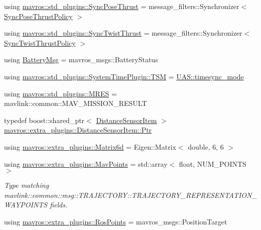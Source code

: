 \begin{DoxyCompactItemize}
\item 
using \mbox{\hyperlink{group__plugin_gab78f646d4cfccf2c656a3aeb2605cad1}{mavros\+::std\+\_\+plugins\+::\+Sync\+Pose\+Thrust}} = message\+\_\+filters\+::\+Synchronizer$<$ \mbox{\hyperlink{group__plugin_ga48ed4062810bb42590cbed0b4e0dc237}{Sync\+Pose\+Thrust\+Policy}} $>$
\item 
using \mbox{\hyperlink{group__plugin_ga4a8954a9b71d632e038309fa85fe5bb2}{mavros\+::std\+\_\+plugins\+::\+Sync\+Twist\+Thrust}} = message\+\_\+filters\+::\+Synchronizer$<$ \mbox{\hyperlink{group__plugin_gacfaec844da30bf9462d4583c55fa64e1}{Sync\+Twist\+Thrust\+Policy}} $>$
\item 
using \mbox{\hyperlink{group__plugin_gaa1fcc4bfa5eda09f217448b6d2d373fa}{Battery\+Msg}} = mavros\+\_\+msgs\+::\+Battery\+Status
\item 
using \mbox{\hyperlink{group__plugin_ga57fc98429d89947298f623d8fbb37364}{mavros\+::std\+\_\+plugins\+::\+System\+Time\+Plugin\+::\+T\+SM}} = \mbox{\hyperlink{group__mavutils_gac7f53712a7627f397d0eb145c2a16cf7}{U\+A\+S\+::timesync\+\_\+mode}}
\item 
using \mbox{\hyperlink{group__plugin_ga70798af9f8bc5db9dd75d667d4488ae6}{mavros\+::std\+\_\+plugins\+::\+M\+R\+ES}} = mavlink\+::common\+::\+M\+A\+V\+\_\+\+M\+I\+S\+S\+I\+O\+N\+\_\+\+R\+E\+S\+U\+LT
\item 
typedef boost\+::shared\+\_\+ptr$<$ \mbox{\hyperlink{classmavros_1_1extra__plugins_1_1DistanceSensorItem}{Distance\+Sensor\+Item}} $>$ \mbox{\hyperlink{group__plugin_ga0156f4cebc73c6f4b88d5a4053e98c2b}{mavros\+::extra\+\_\+plugins\+::\+Distance\+Sensor\+Item\+::\+Ptr}}
\item 
using \mbox{\hyperlink{group__plugin_gaf27101661ecc1fbce6f79a56a3982327}{mavros\+::extra\+\_\+plugins\+::\+Matrix6d}} = Eigen\+::\+Matrix$<$ double, 6, 6 $>$
\item 
using \mbox{\hyperlink{group__plugin_gafae91f0662f199848c074fd4d2edd106}{mavros\+::extra\+\_\+plugins\+::\+Mav\+Points}} = std\+::array$<$ float, N\+U\+M\+\_\+\+P\+O\+I\+N\+TS $>$
\begin{DoxyCompactList}\small\item\em Type matching mavlink\+::common\+::msg\+::\+T\+R\+A\+J\+E\+C\+T\+O\+R\+Y\+::\+T\+R\+A\+J\+E\+C\+T\+O\+R\+Y\+\_\+\+R\+E\+P\+R\+E\+S\+E\+N\+T\+A\+T\+I\+O\+N\+\_\+\+W\+A\+Y\+P\+O\+I\+N\+TS fields. \end{DoxyCompactList}\item 
using \mbox{\hyperlink{group__plugin_ga93699d5632be3dfe1bb548ed5a0b4171}{mavros\+::extra\+\_\+plugins\+::\+Ros\+Points}} = mavros\+\_\+msgs\+::\+Position\+Target
\end{DoxyCompactItemize}
